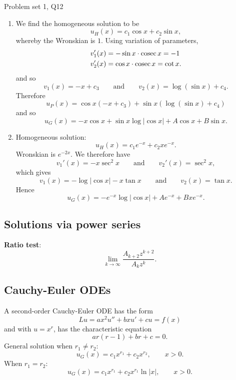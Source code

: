 \begin{problem}{Problem set 1, Q12}{}
\begin{enumerate}
        Hence
            $$ u_P(x) = e^x \bigl[ c_3 + \log(1 + e^x) - x \bigr]
                + e^{-x} \bigl[ c_4 - \log(1 + e^x) \bigr] - 1 , $$
        and of course $u_G(x) = u_P(x) + u_H(x)$.
        \item {} We find the homogeneous solution to be
            $$ u_H(x) = c_1 \cos x + c_2 \sin x , $$
        whereby the Wronskian is $1$. Using variation of parameters,
            \begin{align*}
                v_1'(x) &= -\sin x \cdot \operatorname{cosec} x = -1 \\
                v_2'(x) &= \cos x \cdot \operatorname{cosec} x = \cot x .
            \end{align*}
        and so
            $$ v_1(x) = -x + c_3 \qquad \text{and} \qquad
                v_2(x) = \log(\sin x) + c_4 . $$
        Therefore
            $$ u_P(x) = \cos x (-x + c_3) +
                \sin x (\log(\sin x) + c_4) $$
        and so
            $$ u_G(x) = -x \cos x + \sin x \log \lvert \cos x \rvert
                + A \cos x + B \sin x . $$
        \item {} Homogeneous solution:
            $$ u_H(x) = c_1 e^{-x} + c_2 x e^{-x} . $$
        Wronskian is $e^{-2x}$. We therefore have
            $$ v_1'(x) = -x \sec^2 x 
                \qquad \text{and} \qquad
                v_2'(x) = \sec^2 x , $$
        which gives
            $$ v_1(x) = -\log \lvert \cos x \rvert - x \tan x
                \qquad \text{and} \qquad
                v_2(x) = \tan x . $$
        Hence
            $$ u_G(x) = -e^{-x} \log \lvert \cos x \rvert 
                + Ae^{-x} + Bxe^{-x} . $$
    \end{enumerate}

\end{problem}

\subsection{Solutions via power series}

\textbf{Ratio test}:
    $$ \lim_{k \to \infty} \frac{A_{k + 2}
        z^{k + 2}}{A_k z^k} . $$

\subsection{Cauchy-Euler ODEs}

A second-order Cauchy-Euler ODE has the form
    $$ Lu = ax^2 u'' + bxu' + cu = f(x) $$
and with $u = x^r$, has the characteristic equation
    $$ ar(r - 1) + br + c = 0 . $$
General solution when $r_1 \neq r_2$:
    $$ u_G(x) = c_1 x^{r_1} + c_2 x^{r_2} ,
        \qquad x > 0 . $$
When $r_1 = r_2$:
    $$ u_G(x) = c_1 x^{r_1} + c_2 x^{r_1} \ln \lvert x \rvert,
        \qquad x > 0 . $$

